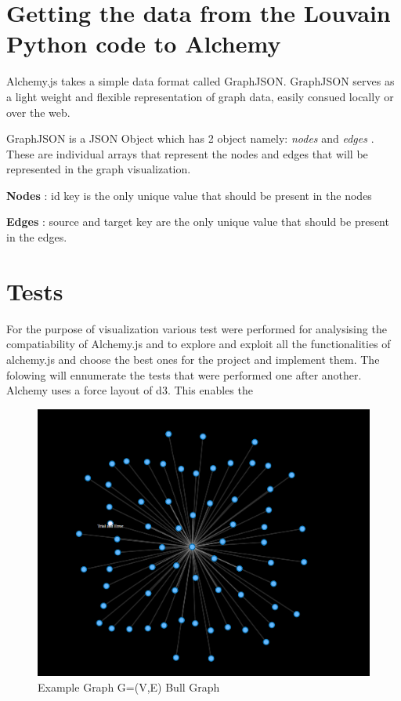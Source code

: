 \section{Getting the data from the Louvain Python code to Alchemy }
 Alchemy.js takes a simple data format called GraphJSON. GraphJSON serves as a light weight and flexible representation of graph data, easily consued locally or over the web. 
\par 
GraphJSON is a JSON Object which has 2 object namely: \textit{nodes} and  \textit{edges} . These are individual arrays that represent the nodes and edges that will be represented in the graph visualization. 
\par \textbf{Nodes} : id key is the only unique value that should be present in the nodes
\par \textbf{Edges} : source and target key are the only unique value that should be present in the edges.

\section{Tests}
For the purpose of visualization various test were performed for analysising the compatiability of Alchemy.js and to explore and exploit all the functionalities of alchemy.js and choose the best ones for the project and implement them.
The folowing will ennumerate the tests that were performed one after another.  Alchemy uses a force layout of d3. This enables the 
\begin{figure}[H]
\centering
\includegraphics[scale=0.3]{t1.png}
\caption{Example Graph G=(V,E) Bull Graph}
\end{figure}

